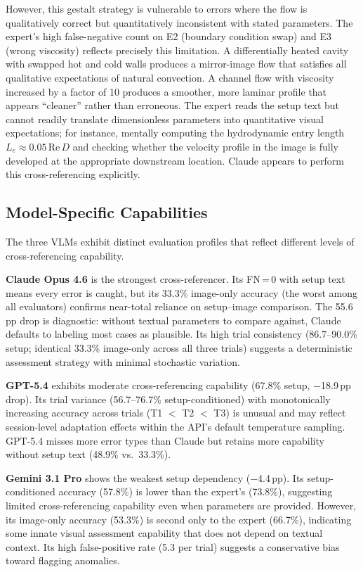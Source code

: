 \documentclass[preprint,12pt]{elsarticle}
\begin{document}
However, this gestalt strategy is vulnerable to errors where the flow is
qualitatively correct but quantitatively inconsistent with stated parameters.
The expert's high false-negative count on E2 (boundary condition swap) and E3
(wrong viscosity) reflects precisely this limitation. A differentially heated
cavity with swapped hot and cold walls produces a mirror-image flow that
satisfies all qualitative expectations of natural convection. A channel flow
with viscosity increased by a factor of 10 produces a smoother, more laminar
profile that appears ``cleaner'' rather than erroneous. The expert reads the
setup text but cannot readily translate dimensionless parameters into
quantitative visual expectations; for instance, mentally computing the
hydrodynamic entry length $L_e \approx 0.05\,\mathrm{Re}\,D$ and checking
whether the velocity profile in the image is fully developed at the
appropriate downstream location. Claude appears to perform this
cross-referencing explicitly.

\subsection{Model-Specific Capabilities}
\label{sec:model-capabilities}

The three VLMs exhibit distinct evaluation profiles that reflect different
levels of cross-referencing capability.

\textbf{Claude Opus 4.6} is the strongest cross-referencer. Its FN\,=\,0
with setup text means every error is caught, but its 33.3\% image-only
accuracy (the worst among all evaluators) confirms near-total reliance on
setup--image comparison. The 55.6\,pp drop is diagnostic: without textual
parameters to compare against, Claude defaults to labeling most cases as
plausible. Its high trial consistency (86.7--90.0\% setup; identical 33.3\%
image-only across all three trials) suggests a deterministic assessment
strategy with minimal stochastic variation.

\textbf{GPT-5.4} exhibits moderate cross-referencing capability (67.8\%
setup, $-$18.9\,pp drop). Its trial variance (56.7--76.7\%
setup-conditioned) with monotonically increasing accuracy across trials
(T1 $<$ T2 $<$ T3) is unusual and may reflect session-level adaptation
effects within the API's default temperature sampling. GPT-5.4 misses more
error types than Claude but retains more capability without setup text
(48.9\% vs.\ 33.3\%).

\textbf{Gemini 3.1 Pro} shows the weakest setup dependency ($-$4.4\,pp).
Its setup-conditioned accuracy (57.8\%) is lower than the expert's (73.8\%),
suggesting limited cross-referencing capability even when parameters are
provided. However, its image-only accuracy (53.3\%) is second only to the
expert (66.7\%), indicating some innate visual assessment capability that
does not depend on textual context. Its high false-positive rate (5.3 per
trial) suggests a conservative bias toward flagging anomalies.
\end{document}
